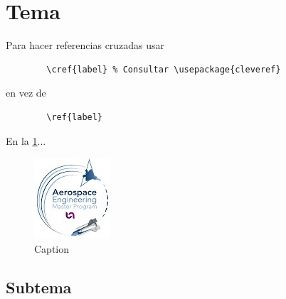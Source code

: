 \label{chap:theory}

\lipsum[17]

\section{Tema}\label{sec:theory bci}

    Para hacer referencias cruzadas usar
    \begin{lstlisting}
        \cref{label} % Consultar \usepackage{cleveref}
    \end{lstlisting}
    en vez de
    \begin{lstlisting}
        \ref{label}
    \end{lstlisting}

    En la \cref{fig:enter-label}... 
    
    \begin{figure}[htb]
        \centering
        \includegraphics[scale=1.2]{graphics/titlepage/mia.jpg}
        \caption{Caption}
        \label{fig:enter-label}
    \end{figure}

    \subsection{Subtema}